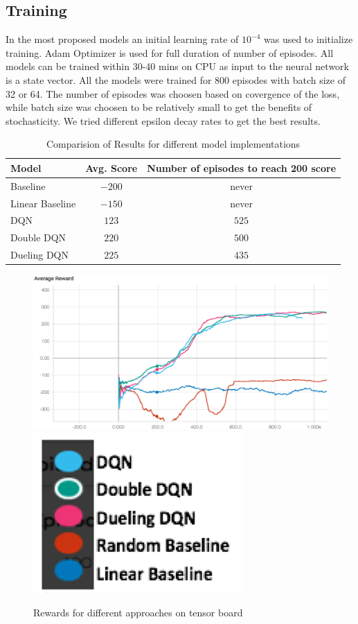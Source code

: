 \subsection{ Training}
In the most proposed models an initial learning rate of $10^{-4}$ was used to initialize training. Adam Optimizer is used for full duration of number of episodes. All models can be trained within 30-40 mins on CPU as input to the neural network is a state vector. All the models were trained for 800 episodes with batch size of 32 or 64. The number of episodes was choosen based on covergence of the loss, while batch size was choosen to be relatively small to get the benefits of stochasticity. We tried different epsilon decay rates to get the best results.

\label{sec:exp}
\begin{table}%
\centering
\begin{tabular}{|l|c|c|}
\hline
Model & Avg. Score  & Number of episodes to reach 200 score  \\
\hline
Baseline & $-200$ & never \\
\hline
Linear Baseline & $-150$ & never \\
\hline
DQN & $123$ & $525$ \\
\hline
Double DQN & $220$ & $500$ \\
\hline
Dueling DQN & $225$ & $435$ \\
\hline
\end{tabular}
\caption{Comparision of Results for different model implementations}
\label{tab:accuracy}
\end{table}

 
\begin{figure}[!ht]
\centering
\includegraphics[scale=0.75,width=0.75\columnwidth]{figures/Picture1.png}%
\includegraphics[scale=0.15,width=0.15\columnwidth]{figures/Legend.png}%
\caption{ Rewards for different approaches on tensor board}%
\label{fig:Visualization}%
\end{figure}



